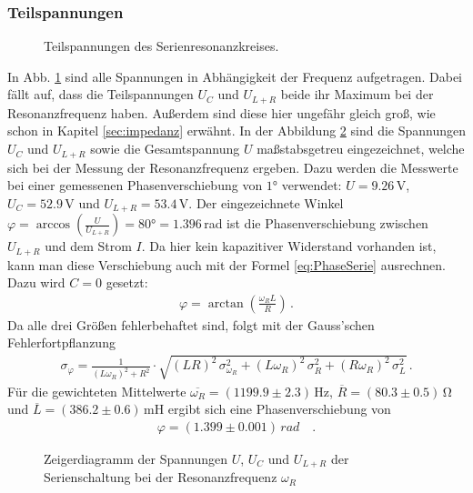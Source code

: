 \documentclass[12pt,a4paper,titlepage,headinclude,bibtotoc]{scrartcl}
\begin{document}
\subsubsection{Teilspannungen}
\begin{figure}[!htb]
	\centering
	
	\caption{Teilspannungen des Serienresonanzkreises.}
	\label{fig:teilU}
\end{figure}
In Abb. \ref{fig:teilU} sind alle Spannungen in Abhängigkeit der Frequenz aufgetragen.
Dabei fällt auf, dass die Teilspannungen $U_C$ und $U_{L+R}$ beide ihr Maximum bei der Resonanzfrequenz haben.
Außerdem sind diese hier ungefähr gleich groß, wie schon in Kapitel \ref{sec:impedanz} erwähnt.
In der Abbildung \ref{fig:zeigerU} sind die Spannungen $U_C$ und $U_{L+R}$ sowie die Gesamtspannung $U$ maßstabsgetreu eingezeichnet, welche sich bei der Messung der Resonanzfrequenz ergeben.
Dazu werden die Messwerte bei einer gemessenen Phasenverschiebung von $1\si\degree$ verwendet: $U=9.26\,$V, $U_C=52.9\,$V und $U_{L+R}=53.4\,$V. 
Der eingezeichnete Winkel $\varphi=\arccos\left(\frac{U}{U_{L+R}}\right)=80\si\degree=1.396\,$rad ist die Phasenverschiebung zwischen $U_{L+R}$ und dem Strom $I$.
Da hier kein kapazitiver Widerstand vorhanden ist, kann man diese Verschiebung auch mit der Formel \eqref{eq:PhaseSerie} ausrechnen. Dazu wird $C=0$ gesetzt:
\begin{align*}
	\varphi=\arctan\left(\frac{\omega_R L}{R}\right)\,.
\end{align*}
Da alle drei Größen fehlerbehaftet sind, folgt mit der Gauss'schen Fehlerfortpflanzung
\begin{align*}	
	\sigma_{\varphi}=\frac{1}{(L \omega_R)^{2} + R^{2}} \cdot \sqrt{(LR)^{2}\, \sigma_{\omega_R}^{2} + (L \omega_R)^{2}\,\sigma_{R}^{2}  + (R \omega_R)^{2}\,\sigma_{L}^{2}}\,.
\end{align*}
Für die gewichteten Mittelwerte $\overline{\omega_R}=(1199.9\pm 2.3)\,\si\hertz$, $\overline{R}=(80.3 \pm 0.5)\,\si\ohm$ und $\overline{L}=(386.2 \pm 0.6)\,\si{\milli\henry}$ ergibt sich eine Phasenverschiebung von
\begin{align*}
	\varphi=(1.399 \pm 0.001)\,\si{rad}\quad.
\end{align*}

\begin{figure}
	\centering	
	\caption{Zeigerdiagramm der Spannungen $U$, $U_C$ und $U_{L+R}$ der Serienschaltung bei der Resonanzfrequenz $\omega_R$}
	\label{fig:zeigerU}
\end{figure}
\end{document}
